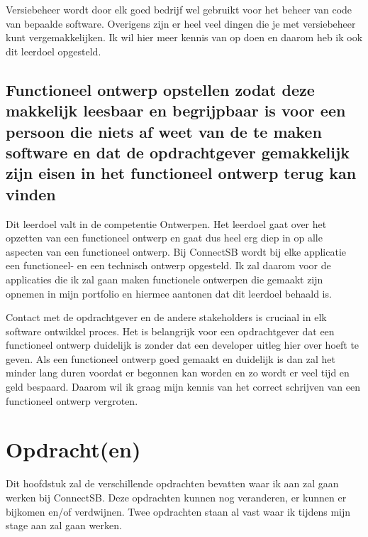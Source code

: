 \documentclass{article}
\begin{document}
Versiebeheer wordt door elk goed bedrijf wel gebruikt voor het beheer van code van bepaalde software. Overigens zijn er heel veel dingen die je met versiebeheer kunt vergemakkelijken. Ik wil hier meer kennis van op doen en daarom heb ik ook dit leerdoel opgesteld.

\subsection{Functioneel ontwerp opstellen zodat deze makkelijk leesbaar en begrijpbaar is voor een persoon die niets af weet van de te maken software en dat de opdrachtgever gemakkelijk zijn eisen in het functioneel ontwerp terug kan vinden}
Dit leerdoel valt in de competentie Ontwerpen. Het leerdoel gaat over het opzetten van een functioneel ontwerp en gaat dus heel erg diep in op alle aspecten van een functioneel ontwerp. Bij ConnectSB wordt bij elke applicatie een functioneel- en een technisch ontwerp opgesteld. Ik zal daarom voor de applicaties die ik zal gaan maken functionele ontwerpen die gemaakt zijn opnemen in mijn portfolio en hiermee aantonen dat dit leerdoel behaald is.

Contact met de opdrachtgever en de andere stakeholders is cruciaal in elk software ontwikkel proces. Het is belangrijk voor een opdrachtgever dat een functioneel ontwerp duidelijk is zonder dat een developer uitleg hier over hoeft te geven. Als een functioneel ontwerp goed gemaakt en duidelijk is dan zal het minder lang duren voordat er begonnen kan worden en zo wordt er veel tijd en geld bespaard. Daarom wil ik graag mijn kennis van het correct schrijven van een functioneel ontwerp vergroten.



\section{Opdracht(en)}
Dit hoofdstuk zal de verschillende opdrachten bevatten waar ik aan zal gaan werken bij ConnectSB. Deze opdrachten kunnen nog veranderen, er kunnen er bijkomen en/of verdwijnen. Twee opdrachten staan al vast waar ik tijdens mijn stage aan zal gaan werken.

\subsection{}

\end{document}

